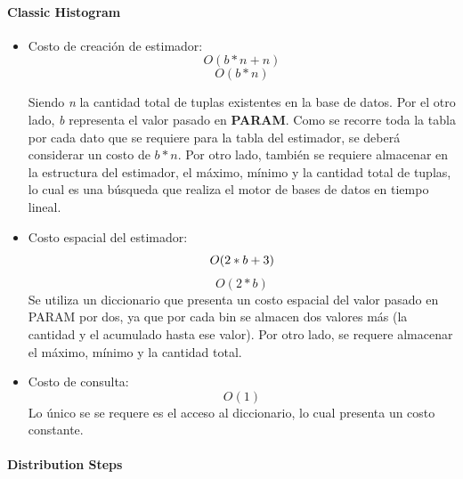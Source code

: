 \documentclass[10pt, a4paper,english,spanish,hidelinks]{article}
\begin{document}
\paragraph{Classic Histogram}
\begin{itemize}

\item Costo de creación de estimador:
\begin{equation}
O(b * n + n )
\end{equation}
\begin{equation}
O(b * n)
\end{equation}

Siendo \textit{n} la cantidad total de tuplas existentes en la base de datos.
Por el otro lado, \textit{b} representa el valor pasado en \textbf{PARAM}.
Como se recorre toda la tabla por cada dato que se requiere para la tabla del estimador,
se deberá considerar un costo de $b * n$. Por otro lado, también se requiere almacenar en
la estructura del estimador, el máximo, mínimo y la cantidad total de tuplas, lo cual es
una búsqueda que realiza el motor de bases de datos en tiempo lineal.

\item Costo espacial del estimador:
\begin{equation}
O(2 * b + 3 ) \\
\end{equation}
\begin{equation}
O(2 * b)
\end{equation}
Se utiliza un diccionario que presenta un costo espacial del valor pasado en PARAM por dos,
ya que por cada bin se almacen dos valores más (la cantidad y el acumulado hasta ese valor).
Por otro lado, se requere almacenar el máximo, mínimo y la cantidad total.

\item Costo de consulta:
\begin{equation}
O(1)
\end{equation}
Lo único se se requere es el acceso al diccionario, lo cual presenta un costo constante.

\end{itemize}
\paragraph{Distribution Steps}
\end{document}
